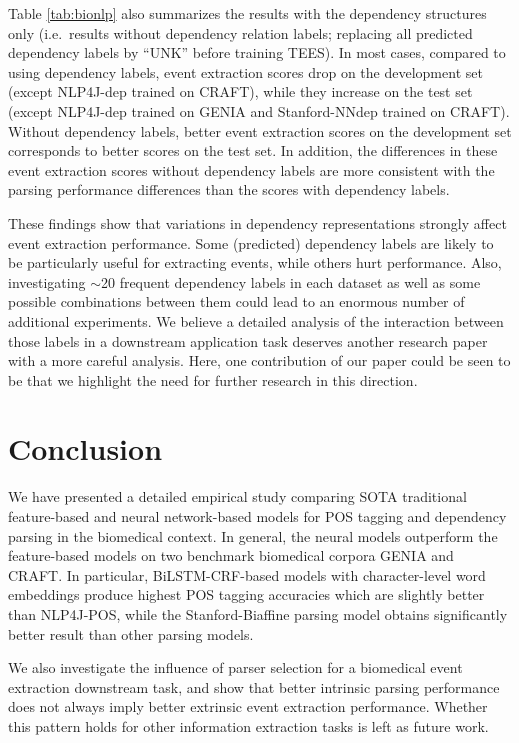 \documentclass[twocolumn,hyperref]{bmcart}\pdfoutput=1
\begin{document}
   
Table  \ref{tab:bionlp}  also summarizes the results with the dependency structures only (i.e.\ results without dependency relation labels; replacing all predicted dependency labels by  ``UNK''  before training TEES). In most cases, compared to using dependency labels, event extraction scores drop on the development set (except NLP4J-dep trained on CRAFT), while they increase on the test set (except NLP4J-dep trained on GENIA and Stanford-NNdep trained on CRAFT). Without dependency labels,  better event extraction scores on the development set corresponds to better scores on the test set. In addition, the differences in these event extraction scores without dependency labels are more consistent with the parsing performance differences than the scores with dependency labels. 

These findings show that variations in dependency  representations strongly affect event extraction performance.  Some (predicted) dependency labels are likely to be particularly useful for extracting events, while others hurt performance. Also, investigating $\sim$20 frequent dependency labels in each dataset as well as some possible combinations between them could lead to an enormous number of additional experiments. We believe a detailed analysis of the interaction between those  labels in a downstream application task deserves another research paper with a more careful analysis. Here, one contribution of our paper could be seen to be that we highlight the need for further research  in this direction.
 
\section*{Conclusion}

We have presented a detailed empirical study comparing SOTA traditional feature-based and neural network-based models for POS tagging and dependency parsing in the biomedical context.  
In general, the neural models outperform the feature-based models on two benchmark biomedical corpora GENIA and CRAFT. In particular,  BiLSTM-CRF-based models with character-level word embeddings produce highest POS tagging accuracies  which are slightly better than NLP4J-POS, while the   Stanford-Biaffine parsing model obtains significantly better  result than other parsing models.    

We also investigate the influence of parser selection for a biomedical event extraction downstream task,  and show that better intrinsic parsing performance does not always imply better extrinsic event extraction performance. Whether this pattern holds for other  information extraction tasks is left as future work.  
\end{document}
